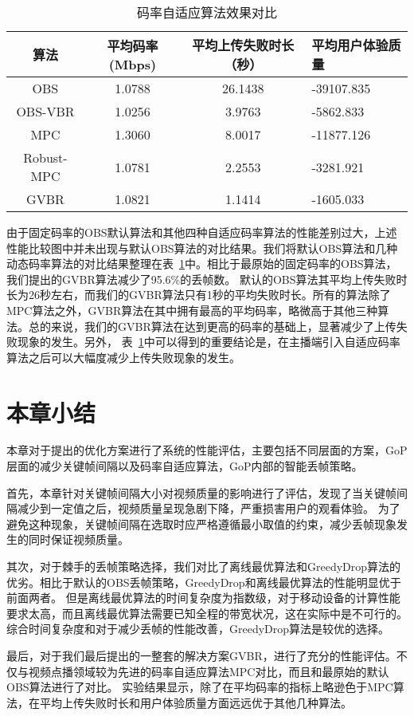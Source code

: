 \begin{table}[tb]
\centering
\caption{码率自适应算法效果对比}
\label{tab:vbr}
\begin{tabularx}{\linewidth}{cccX}
\toprule[1.5pt]
\textbf{算法} &\textbf{平均码率(Mbps)} &\textbf{平均上传失败时长（秒）} & \textbf{平均用户体验质量}    \\ \midrule[1pt]
OBS    &1.0788  &26.1438  &-39107.835           \\
OBS-VBR  &1.0256 &3.9763  &-5862.833         \\
MPC     &1.3060  &8.0017  &-11877.126 \\
Robust-MPC &1.0781 &2.2553 &-3281.921 \\
GVBR &1.0821 &1.1414 &-1605.033 \\
\bottomrule[1.5pt]
\end{tabularx}
\end{table}

由于固定码率的OBS默认算法和其他四种自适应码率算法的性能差别过大，上述性能比较图中并未出现与默认OBS算法的对比结果。我们将默认OBS算法和几种动态码率算法的对比结果整理在表~\ref{tab:vbr}中。相比于最原始的固定码率的OBS算法，我们提出的GVBR算法减少了95.6\%的丢帧数。
默认的OBS算法其平均上传失败时长为26秒左右，而我们的GVBR算法只有1秒的平均失败时长。所有的算法除了MPC算法之外，GVBR算法在其中拥有最高的平均码率，略微高于其他三种算法。总的来说，我们的GVBR算法在达到更高的码率的基础上，显著减少了上传失败现象的发生。另外，
表~\ref{tab:vbr}中可以得到的重要结论是，在主播端引入自适应码率算法之后可以大幅度减少上传失败现象的发生。

\section{本章小结}
本章对于提出的优化方案进行了系统的性能评估，主要包括不同层面的方案，GoP层面的减少关键帧间隔以及码率自适应算法，GoP内部的智能丢帧策略。

首先，本章针对关键帧间隔大小对视频质量的影响进行了评估，发现了当关键帧间隔减少到一定值之后，视频质量呈现急剧下降，严重损害用户的观看体验。
为了避免这种现象，关键帧间隔在选取时应严格遵循最小取值的约束，减少丢帧现象发生的同时保证视频质量。

其次，对于棘手的丢帧策略选择，我们对比了离线最优算法和GreedyDrop算法的优劣。相比于默认的OBS丢帧策略，GreedyDrop和离线最优算法的性能明显优于前面两者。
但是离线最优算法的时间复杂度为指数级，对于移动设备的计算性能要求太高，而且离线最优算法需要已知全程的带宽状况，这在实际中是不可行的。综合时间复杂度和对于减少丢帧的性能改善，GreedyDrop算法是较优的选择。

最后，对于我们最后提出的一整套的解决方案GVBR，进行了充分的性能评估。不仅与视频点播领域较为先进的码率自适应算法MPC对比，而且和最原始的默认OBS算法进行了对比。
实验结果显示，除了在平均码率的指标上略逊色于MPC算法，在平均上传失败时长和用户体验质量方面远远优于其他几种算法。